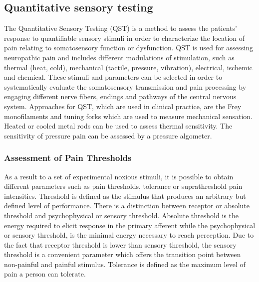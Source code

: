 \subsection{Quantitative sensory testing}
The Quantitative Sensory Testing (QST) is a method to assess the patients' response to quantifiable sensory stimuli in order to characterize the location of pain relating to somatosensory function or dysfunction. QST is used for assessing neuropathic pain and includes different modulations of stimulation, such as thermal (heat, cold), mechanical (tactile, pressure, vibration), electrical, ischemic and chemical. These stimuli and parameters can be selected in order to systematically evaluate the somatosensory transmission and pain processing by engaging different nerve fibers, endings and pathways of the central nervous system. Approaches for QST, which are used in clinical practice, are the Frey monofilaments and tuning forks which are used to measure mechanical sensation. Heated or cooled metal rods can be used to assess thermal sensitivity. The sensitivity of pressure pain can be assessed by a pressure algometer. \cite{Fillingim2016}


\subsubsection{Assessment of Pain Thresholds}\label{AoPT}
As a result to a set of experimental noxious stimuli, it is possible to obtain different parameters such as pain thresholds, tolerance or suprathreshold pain intensities. Threshold is defined as the stimulus that produces an arbitrary but defined level of performance. There is a distinction between receptor or absolute threshold and psychophysical or sensory threshold. Absolute threshold is the energy required to elicit response in the primary afferent while the psychophysical or sensory threshold, is the minimal energy necessary to reach perception. Due to the fact that receptor threshold is lower than sensory threshold, the sensory threshold is a convenient parameter which offers the transition point between non-painful and painful stimulus. Tolerance is defined as the maximum level of pain a person can tolerate.  \cite{Yarnitsky2006}

